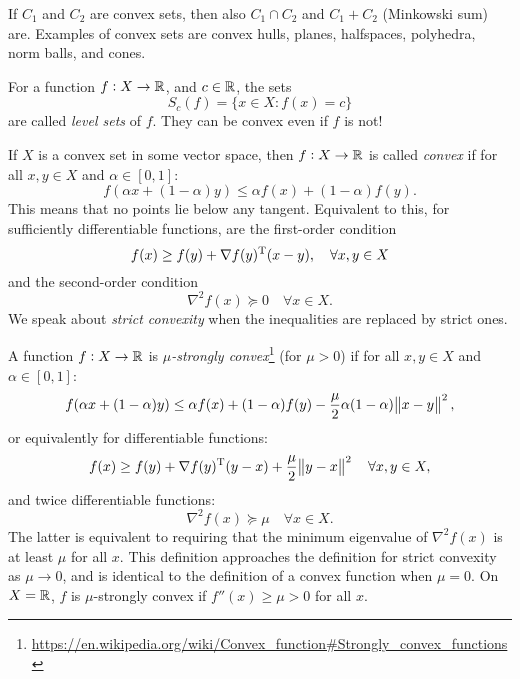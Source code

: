 \documentclass{article}
\begin{document}
If \(C_1\) and \(C_2\) are convex sets, then also \(C_1 \cap C_2\) and \(C_1 + C_2\) (Minkowski sum)
are.  Examples of convex sets are convex hulls, planes, halfspaces, polyhedra, norm balls, and
cones. 

\label{s:level-sets}

For a function \(f: X \to \mathbb{R}\), and \(c \in \mathbb{R}\), the sets
\begin{equation*}
  S_c(f) = \{x \in X: f(x) = c\}
\end{equation*}
are called \emph{level sets} of \(f\). They can be convex even if \(f\) is not!

\label{s:convex_functions}

If \(X\) is a convex set in some vector space, then \(f: X \to \mathbb{R}\) is called \emph{convex} if for
all \(x, y \in X\) and \(\alpha \in [0,1]\):
\begin{equation*}
  f(\alpha x + (1 - \alpha) y) \leq \alpha f(x) + (1 - \alpha) f(y).
\end{equation*}
This means that no points lie below any tangent.  Equivalent to this, for sufficiently
differentiable functions, are the first-order condition
\begin{equation*}
  f(x) \geq f(y) + \nabla f(y)^{\mathrm{T}}(x - y), \quad \forall x, y \in X
\end{equation*}
and the second-order condition
\begin{equation*}
  \nabla^2 f(x) \succeq 0 \quad \forall x \in X.
\end{equation*}
We speak about \emph{strict convexity} when the inequalities are replaced by strict ones.

\label{s:strong-convexity}

A function \(f: X \to \mathbb{R}\) is \emph{\(\mu\)-strongly
  convex}\footnote{\url{https://en.wikipedia.org/wiki/Convex_function\#Strongly_convex_functions}}
(for \(\mu > 0\)) if for all \(x, y \in X\) and \(\alpha \in [0,1]\):
\begin{equation*}
  f(\alpha x + (1 - \alpha) y) \leq \alpha f(x) + (1 - \alpha) f(y)
  - \frac{\mu}{2} \alpha (1 - \alpha) \enVert[1]{x - y}^2,
\end{equation*}
or equivalently for differentiable functions:
\begin{equation*}
  f(x) \geq f(y) + \T{\nabla f(y)}(y - x) + \frac{\mu}{2}\enVert[1]{y - x}^2
  \quad \forall x, y \in X,
\end{equation*}
and twice differentiable functions:
\begin{equation*}
  \nabla^2 f(x) \succeq \mu \quad \forall x \in X.
\end{equation*}
The latter is equivalent to requiring that the minimum eigenvalue of \(\nabla^2 f(x)\) is at least
\(\mu\) for all \(x\).  This definition approaches the definition for strict convexity as
\(\mu \to 0\), and is identical to the definition of a convex function when \(\mu = 0\).  On
\(X = \mathbb{R}\), \(f\) is \(\mu\)-strongly convex if \(f''(x) \geq \mu > 0\) for all \(x\).
\end{document}
